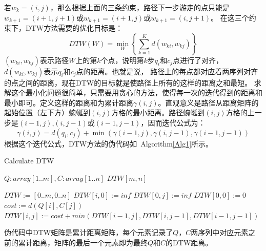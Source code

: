 若$w_k=(i,j)$，那么根据上面的三条约束，路径下一步游走的点只能是$w_{k+1}=(i+1,j+1)$或$w_{k+1}=(i+1,j)$或$w_{k+1}=(i,j+1)$。
在这三个约束下，DTW方法需要的优化目标是：
\begin{equation}\label{equ:3}
    DTW(W) = \mathop {\min }\limits_W \left\{ {\sum\limits_{k = 1}^K {d\left( {{w_{ki}},{w_{kj}}} \right)} } \right\}
\end{equation}
$\left( w_{ki},w_{kj} \right)$表示路径$W$上的第$k$个点，说明第$k$步$q_i$和$c_j$点进行了对齐，${d\left( {{w_{ki}},{w_{kj}}} \right)}$表示$q_i$和$c_j$点的距离。也就是说， 路径上的每点都对应着两序列对齐的点之间的距离，现在DTW的目标就是使路径上所有的这样的距离之和最短。
求解这个最小化问题很简单，只需要用贪心的方法，使得每一次的迭代得到的距离和最小即可。定义这样的距离和为累计距离$\gamma(i,j)$。直观意义是路径从距离矩阵的起始位置（左下方）蜿蜒到$(i,j)$方格的最小距离。路径蜿蜒到$(i,j)$方格的上一步是$(i-1,j)$,$(i,j-1)$或$(i-1,j-1)$，因而迭代公式为：
\begin{equation}\label{equ:4}
  \gamma(i,j)=d(q_i,c_j)+\min \left( {\gamma \left( {i - 1,j} \right),\gamma \left( {i,j - 1} \right),\gamma \left( {i - 1,j - 1} \right)} \right)
\end{equation}
根据这个迭代公式，DTW方法的伪代码如\ Algorithm\ref{Alg1}所示。

\begin{algorithm}[h]
\caption{Calculate DTW}
\begin{algorithmic}[1]
\small
\REQUIRE $Q:array[1..m], C:array[1..n]$
\ENSURE $DTW[m,n]$

\STATE $DTW := [0..m,0..n]$
\STATE $DTW[i,0] := inf$
\ENDFOR
{}
\STATE $DTW[0,j] := inf$
\ENDFOR
\STATE $DTW[0,0] := 0$
\STATE
{}
\STATE $cost:=d(Q[i],C[j])$
\STATE $DTW[i,j]:=cost+min(DTW[i-1,j],DTW[i,j-1],DTW[i-1,j-1])$
\ENDFOR
\ENDFOR
\end{algorithmic}
\label{Alg1}
\end{algorithm}

伪代码中DTW矩阵是累计距离矩阵，每个元素记录了$Q$，$C$两序列中对应元素之前的累计距离，矩阵的最后一个元素即为最终$Q$和$C$的DTW距离。

